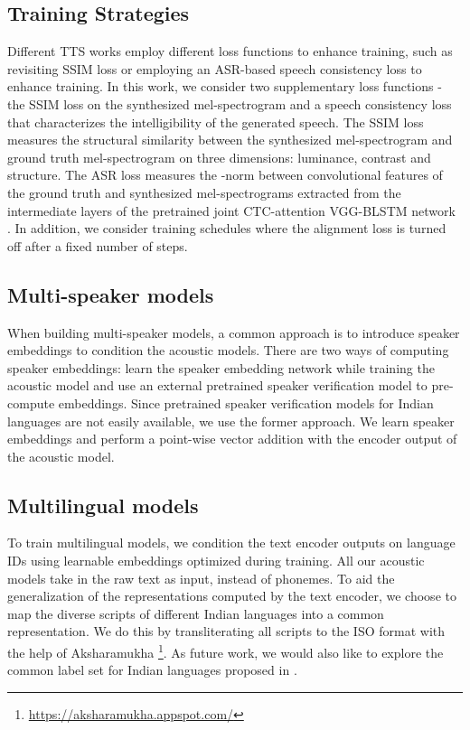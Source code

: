 \documentclass{article}
\begin{document}
\subsection{Training Strategies}
\label{subsec:training-strategies}
Different TTS works employ different loss functions to enhance training, such as revisiting SSIM loss \cite{ren2022revisiting} or employing an ASR-based speech consistency loss \cite{li2021starganv2} to enhance training.
In this work, we consider two supplementary loss functions - the SSIM loss on the synthesized mel-spectrogram and a speech consistency loss \cite{wang2004image} that characterizes the intelligibility of the generated speech.
The SSIM loss measures the structural similarity between the synthesized mel-spectrogram and ground truth mel-spectrogram on three dimensions: luminance, contrast and structure.
The ASR loss measures the -norm between convolutional features of the ground truth and synthesized mel-spectrograms extracted from the intermediate layers of the pretrained joint CTC-attention VGG-BLSTM network \cite{li2021starganv2}.
In addition, we consider training schedules where the alignment loss is turned off after a fixed number of steps. 



\subsection{Multi-speaker models}
When building multi-speaker models, a common approach is to introduce speaker embeddings to condition the acoustic models.
There are two ways of computing speaker embeddings: learn the speaker embedding network while training the acoustic model \cite{gibiansky2017deep, ping2018deep} and use an external pretrained speaker verification model \cite{wan2018generalized} to pre-compute embeddings.
Since pretrained speaker verification models for Indian languages are not easily available, we use the former approach. 
We learn speaker embeddings and perform a point-wise vector addition with the encoder output of the acoustic model.  





\subsection{Multilingual models}
To train multilingual models, we condition the text encoder outputs on language IDs using learnable embeddings optimized during training. 
All our acoustic models take in the raw text as input, instead of phonemes.
To aid the generalization of the representations computed by the text encoder, we choose to map the diverse scripts of different Indian languages into a common representation. 
We do this by transliterating all scripts to the ISO format with the help of Aksharamukha \footnote{ \scriptsize\url{https://aksharamukha.appspot.com/}}. As future work, we would also like to explore the common label set for Indian languages proposed in \cite{baby2016unified}.
\end{document}
